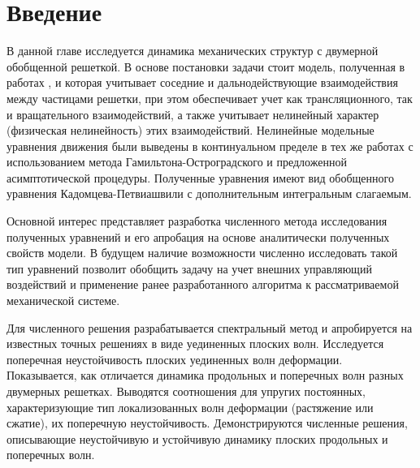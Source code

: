 	
\section{Введение}



В данной главе исследуется динамика механических структур с двумерной обобщенной решеткой. В основе постановки задачи стоит модель, полученная в работах \cite{porkros, PorOsAnt2020}, и которая учитывает соседние и дальнодействующие взаимодействия между частицами решетки, при этом обеспечивает учет как трансляционного, так и вращательного взаимодействий, а также учитывает нелинейный характер (физическая нелинейность) этих взаимодействий. Нелинейные модельные уравнения движения были выведены в континуальном пределе в тех же работах с использованием метода Гамильтона-Остроградского и предложенной асимптотической процедуры. Полученные уравнения имеют вид обобщенного уравнения Кадомцева-Петвиашвили с дополнительным интегральным слагаемым. 

Основной интерес представляет разработка численного метода исследования полученных уравнений и его апробация на основе аналитически полученных свойств модели. В будущем наличие возможности численно исследовать такой тип уравнений позволит обобщить задачу на учет внешних управляющий воздействий и применение ранее разработанного алгоритма к рассматриваемой механической системе.

Для численного решения разрабатывается спектральный метод и апробируется на известных точных решениях в виде уединенных плоских волн. Исследуется поперечная неустойчивость плоских уединенных волн деформации. Показывается, как отличается динамика продольных и поперечных волн разных двумерных решетках. Выводятся соотношения для упругих постоянных, характеризующие тип локализованных волн деформации (растяжение или сжатие), их поперечную неустойчивость. Демонстрируются численные решения, описывающие неустойчивую и устойчивую динамику плоских продольных и поперечных волн.


